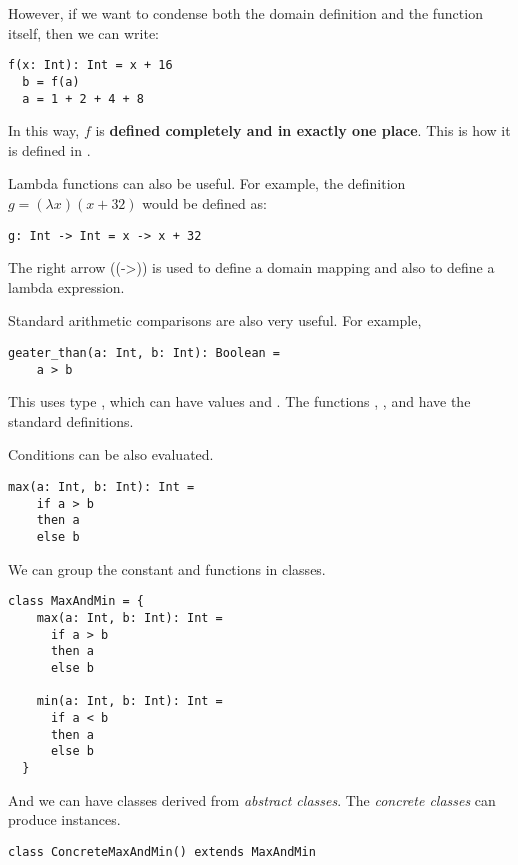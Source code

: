 However, if we want to condense both the domain definition and the function itself, then we can write:
\begin{lstlisting}[label={lst:exampleFunctionDefinition}]
  f(x: Int): Int = x + 16
  b = f(a)
  a = 1 + 2 + 4 + 8
\end{lstlisting}

In this way, $f$ is \textbf{defined completely and in exactly one place}.
This is how it is defined in \Soda.

Lambda functions can also be useful.
For example, the definition
$g = (\lambda x)(x + 32)$
would be defined as:
\begin{lstlisting}[label={lst:exampleFunctionDefinitionWithLambda}]
  g: Int -> Int = x -> x + 32
\end{lstlisting}

The right arrow (\srccode(->)) is used to define a domain mapping and also to define a lambda expression.

Standard arithmetic comparisons are also very useful.
For example,
\begin{lstlisting}[label={lst:exampleComparison}]
  geater_than(a: Int, b: Int): Boolean =
    a > b
\end{lstlisting}

This uses type , which can have values \sodafalse and \sodatrue.
The functions \sodaand, \sodaor, and \sodanot have the standard definitions.

Conditions can be also evaluated.
\begin{lstlisting}[label={lst:exampleMax}]
  max(a: Int, b: Int): Int =
    if a > b
    then a
    else b
\end{lstlisting}

We can group the constant and functions in classes.

\begin{lstlisting}[label={lst:exampleClassMax}]
  class MaxAndMin = {
    max(a: Int, b: Int): Int =
      if a > b
      then a
      else b

    min(a: Int, b: Int): Int =
      if a < b
      then a
      else b
  }
\end{lstlisting}

And we can have classes derived from \emph{abstract classes}.
The \emph{concrete classes} can produce instances.

\begin{lstlisting}[label={lst:exampleClassMaxWithIndex}]
  class ConcreteMaxAndMin() extends MaxAndMin
\end{lstlisting}


